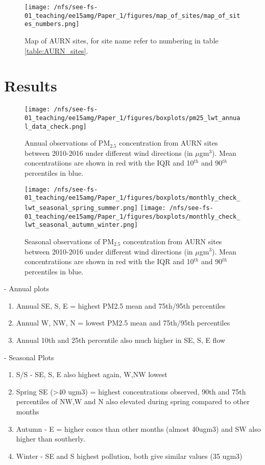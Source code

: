 \documentclass[10pt]{article}
\begin{document}
\begin{figure}[!ht]
    \texttt{[image: /nfs/see-fs-01\_teaching/ee15amg/Paper\_1/figures/map\_of\_sites/map\_of\_sites\_numbers.png]}
    \caption{Map of AURN sites, for site name refer to numbering in table \ref{table:AURN_sites}. }
    \label{fig:annual_boxplot}
\end{figure}



\section*{Results}

\begin{figure}[!ht]
    \texttt{[image: /nfs/see-fs-01\_teaching/ee15amg/Paper\_1/figures/boxplots/pm25\_lwt\_annual\_data\_check.png]}
    \caption{Annual observations of PM$_{2.5}$ concentration from AURN sites between 2010-2016 under different wind directions (in $\mu$gm$^{3}$). Mean concentratiions are shown in red with the IQR and 10$^{th}$ and 90$^{th}$ percentiles in blue.}
    \label{fig:annual_boxplot}
\end{figure}

\begin{figure}[!ht]
  \texttt{[image: /nfs/see-fs-01\_teaching/ee15amg/Paper\_1/figures/boxplots/monthly\_check\_lwt\_seasonal\_spring\_summer.png]}
  \texttt{[image: /nfs/see-fs-01\_teaching/ee15amg/Paper\_1/figures/boxplots/monthly\_check\_lwt\_seasonal\_autumn\_winter.png]}
  \caption{Seasonal observations of PM$_{2.5}$ concentration from AURN sites between 2010-2016 under different wind directions (in $\mu$gm$^{3}$). Mean concentratiions are shown in red with the IQR and 10$^{th}$ and 90$^{th}$ percentiles in blue.}
  \label{fig:seasonal_boxplot}
\end{figure}

- Annual plots
\begin{enumerate}
\item Annual SE, S, E = highest PM2.5 mean and 75th/95th percentiles
\item Annual W, NW, N = lowest PM2.5 mean and 75th/95th percentiles
\item Annual 10th and 25th percentile also much higher in SE, S, E flow
\end{enumerate}

- Seasonal Plots
\begin{enumerate}
\item S/S - SE, S, E also highest again, W,NW lowest 
\item Spring SE (>40 ugm3) = highest concentrations observed, 90th and 75th percentiles of NW,W and N also elevated during spring compared to other months
\item Autumn - E = higher concs than other months (almost 40ugm3) and SW also higher than southerly.
\item Winter - SE and S highest pollution, both give similar values (35 ugm3) 
\end{enumerate}
\end{document}
